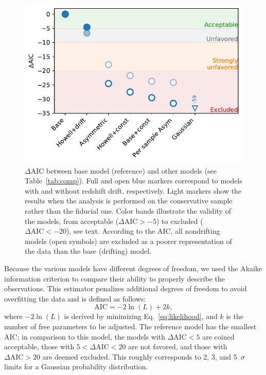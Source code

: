 \documentclass[]{aa}
\begin{document}
\begin{figure}
    \centering
    \includegraphics[width=\linewidth]{Article_figures/mod_comp.pdf}
    \caption{$\Delta$AIC between base model (reference) and other models
        (see Table~\ref{tab:comp}). Full and open blue markers correspond to
        models with and without redshift drift, respectively. Light markers show
        the results when the analysis is performed on the conservative sample
        rather than the fiducial one. Color bands illustrate the validity of
        the models, from acceptable ($\Delta\mathrm{AIC} > -5$) to excluded
        ($\Delta\mathrm{AIC} < -20$), see text. According to the AIC, all
        nondrifting models (open symbols) are excluded as a poorer representation of the data than the base (drifting) model.}
    \label{fig:mod_comp}
\end{figure}

Because the various models have different degrees of freedom, we used the Akaike
information criterion \citep[AIC, e.g.,][]{burnham2004} to compare their ability
to properly describe the observations. This estimator penalizes additional degrees of
freedom to avoid overfitting the data and is defined as follows:
\begin{equation}
    \mathrm{AIC} = -2\ln(L) + 2k
,\end{equation}
where $-2\ln(L)$ is derived by minimizing Eq.~\eqref{eq:likelihood}, and $k$ is
the number of free parameters to be adjusted. The reference model has the smallest AIC; in comparison to this model, the models with
$\Delta\mathrm{AIC}<5$ are coined acceptable, those with
$5<\Delta\mathrm{AIC}<20$ are not favored, and those with $\Delta\mathrm{AIC}>20$
are deemed excluded. This roughly corresponds to 2, 3, and 5~$\sigma$ limits for
a Gaussian probability distribution. 
\end{document}

